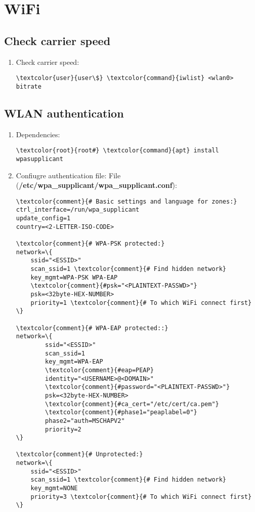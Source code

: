 \documentclass[10pt, a4paper, onecolumn, openany]{book} %
\begin{document}
\section{WiFi}
\subsection{Check carrier speed}
\begin{enumerate}
    \item Check carrier speed:
\begin{Verbatim}[commandchars=\\\{\}]
\textcolor{user}{user\$} \textcolor{command}{iwlist} <wlan0> bitrate
\end{Verbatim}
\end{enumerate}
\subsection{WLAN authentication}
\begin{enumerate}
    \item Dependencies:
\begin{Verbatim}[commandchars=\\\{\}]
\textcolor{root}{root#} \textcolor{command}{apt} install wpasupplicant
\end{Verbatim}
    \item Confiugre authentication file:
\newline File (\textbf{\textcolor{file}{/etc/wpa\_supplicant/wpa\_supplicant.conf}}):
\begin{Verbatim}[commandchars=\\\{\}]
\textcolor{comment}{# Basic settings and language for zones:}
ctrl_interface=/run/wpa_supplicant
update_config=1
country=<2-LETTER-ISO-CODE>

\textcolor{comment}{# WPA-PSK protected:}
network=\{
    ssid="<ESSID>"
    scan_ssid=1 \textcolor{comment}{# Find hidden network}
    key_mgmt=WPA-PSK WPA-EAP
    \textcolor{comment}{#psk="<PLAINTEXT-PASSWD>"}
    psk=<32byte-HEX-NUMBER>
    priority=1 \textcolor{comment}{# To which WiFi connect first}
\}

\textcolor{comment}{# WPA-EAP protected::}
network=\{
        ssid="<ESSID>"
        scan_ssid=1
        key_mgmt=WPA-EAP
        \textcolor{comment}{#eap=PEAP}
        identity="<USERNAME>@<DOMAIN>"
        \textcolor{comment}{#password="<PLAINTEXT-PASSWD>"}
        psk=<32byte-HEX-NUMBER>
        \textcolor{comment}{#ca_cert="/etc/cert/ca.pem"}
        \textcolor{comment}{#phase1="peaplabel=0"}
        phase2="auth=MSCHAPV2"
        priority=2
\}

\textcolor{comment}{# Unprotected:}
network=\{
    ssid="<ESSID>"
    scan_ssid=1 \textcolor{comment}{# Find hidden network}
    key_mgmt=NONE
    priority=3 \textcolor{comment}{# To which WiFi connect first}
\}
\end{Verbatim}
\end{enumerate}
\end{document}
